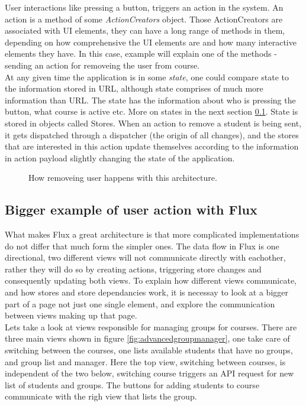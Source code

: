 User interactions like pressing a button, triggers an action in the system. An action is a method of some \emph{ActionCreators} object. Those ActionCreators are associated with UI elements, they can have a long range of methods in them, depending on how comprehensive the UI elements are and how many interactive elements they have. In this case, example will explain one of the methods - sending an action for removeing the user from course.
\\At any given time the application is in some \emph{state}, one could compare state to the information stored in URL, although state comprises of much more information than URL. The state has the information about who is pressing the button, what course is active etc. More on states in the next section \ref{sec:advancedfluxexample}. State is stored in objects called Stores. When an action to remove a student is being sent, it gets dispatched through a dispatcher (the origin of all changes), and the stores that are interested in this action update themselves according to the information in action payload slightly changing the state of the application.

\begin{figure}[h]
  \scalebox{0.8}{}
  \caption{How removeing user happens with this architecture.}
  \label{fig:simplefluxremoveuser}
\end{figure}

\subsection{Bigger example of user action with Flux}\label{sec:advancedfluxexample}
What makes Flux a great architecture is that more complicated implementations do not differ that much form the simpler ones. The data flow in Flux is one directional, two different views will not communicate directly with eachother, rather they will do so by creating actions, triggering store changes and consequently updating both views. To explain how different views communicate, and how stores and store dependancies work, it is necessay to look at a bigger part of a page not just one single element, and explore the communication between views making up that page.
\\Lets take a look at views responsible for managing groups for courses. There are three main views shown in figure \ref{fig:advancedgroupmanager}, one take care of switching between the courses, one lists available students that have no groups, and group list and manager. Here the top view, switching between courses, is independent of the two below, switching course triggers an API request for new list of students and groups. The buttons for adding students to course communicate with the righ view that lists the group.

